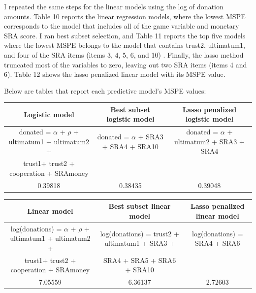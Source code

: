 \documentclass[12pt]{article}
\begin{document}
I repeated the same steps for the linear models using the log of donation amounts. Table 10 reports the linear regression models, where the lowest MSPE corresponds to the model that includes all of the game variable and monetary SRA score. I ran best subset selection, and Table 11 reports the top five models where the lowest MSPE belongs to the model that contains trust2, ultimatum1, and four of the SRA items (items 3, 4, 5, 6, and 10) . Finally, the lasso method truncated most of the variables to zero, leaving out two SRA items (items 4 and 6). Table 12 shows the lasso penalized linear model with its MSPE value.

Below are tables that report each predictive model\rq s MSPE values:


\begin{center}
\begin{adjustbox}{width=\textwidth}
\begin{tabular}{ c | c | c }
\hline \hline
Logistic model & Best subset logistic model & Lasso penalized logistic model \\ 
\hline
\small donated = \(\alpha\) + \(\rho\) + ultimatum1 +  ultimatum2 + & donated = \(\alpha\) + SRA3 + SRA4 + SRA10 & donated = \(\alpha\) + ultimatum2 + SRA3 + SRA4 \\
\small trust1+ trust2 + cooperation + SRAmoney & & \\
 \hline
 0.39818 & 0.38435 & 0.39048 \\  
 \hline \hline
\end{tabular}
\end{adjustbox}
\end{center}
 
 
 
\begin{center}
\begin{adjustbox}{width=\textwidth}
\begin{tabular}{ c | c | c }
\hline \hline
Linear model & Best subset linear model & Lasso penalized linear model \\
\hline
log(donations) = \(\alpha\) + \(\rho\) + ultimatum1 +  ultimatum2 + & log(donations) = trust2 + ultimatum1 + SRA3 + & log(donations) = SRA4 + SRA6 \\
\small trust1+ trust2 + cooperation + SRAmoney & SRA4 + SRA5 + SRA6 + SRA10 & \\
\hline
7.05559 & 6.36137 & 2.72603 \\
\hline \hline
\end{tabular}
\end{adjustbox}
\end{center}
\end{document}
